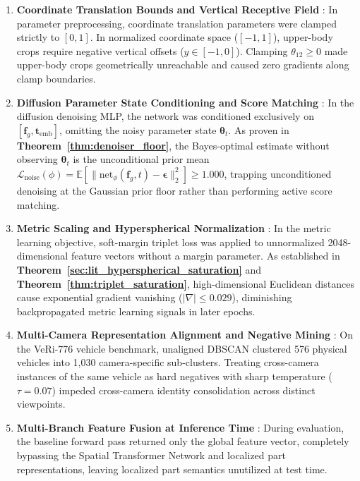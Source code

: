 \begin{enumerate}[itemsep=0.5pt,parsep=0pt,topsep=1.0pt,leftmargin=*]
    \item \textbf{Coordinate Translation Bounds and Vertical Receptive Field} \label{subsec:path4}:
    In parameter preprocessing, coordinate translation parameters were clamped strictly to $[0, 1]$. In normalized coordinate space ($[-1, 1]$), upper-body crops require negative vertical offsets ($y \in [-1, 0]$). Clamping $\theta_{12} \ge 0$ made upper-body crops geometrically unreachable and caused zero gradients along clamp boundaries.

    \item \textbf{Diffusion Parameter State Conditioning and Score Matching} \label{subsec:path5}:
    In the diffusion denoising MLP, the network was conditioned exclusively on $[\mathbf{f}_g, \mathbf{t}_{\text{emb}}]$, omitting the noisy parameter state $\boldsymbol{\theta}_t$. As proven in \textbf{Theorem~\ref{thm:denoiser_floor}}, the Bayes-optimal estimate without observing $\boldsymbol{\theta}_t$ is the unconditional prior mean $\mathcal{L}_{\text{noise}}(\phi) = \mathbb{E}[\|\text{net}_\phi(\mathbf{f}_g, t) - \boldsymbol{\epsilon}\|_2^2] \ge 1.000$, trapping unconditioned denoising at the Gaussian prior floor rather than performing active score matching.

    \item \textbf{Metric Scaling and Hyperspherical Normalization} \label{subsec:path6}:
    In the metric learning objective, soft-margin triplet loss was applied to unnormalized 2048-dimensional feature vectors without a margin parameter. As established in \textbf{Theorem~\ref{sec:lit_hyperspherical_saturation}} and \textbf{Theorem~\ref{thm:triplet_saturation}}, high-dimensional Euclidean distances cause exponential gradient vanishing ($|\nabla| \le 0.029$), diminishing backpropagated metric learning signals in later epochs.

    \item \textbf{Multi-Camera Representation Alignment and Negative Mining} \label{subsec:path7}:
    On the VeRi-776 vehicle benchmark, unaligned DBSCAN clustered 576 physical vehicles into 1,030 camera-specific sub-clusters. Treating cross-camera instances of the same vehicle as hard negatives with sharp temperature ($\tau = 0.07$) impeded cross-camera identity consolidation across distinct viewpoints.

    \item \textbf{Multi-Branch Feature Fusion at Inference Time} \label{subsec:path8}:
    During evaluation, the baseline forward pass returned only the global feature vector, completely bypassing the Spatial Transformer Network and localized part representations, leaving localized part semantics unutilized at test time.
\end{enumerate}

